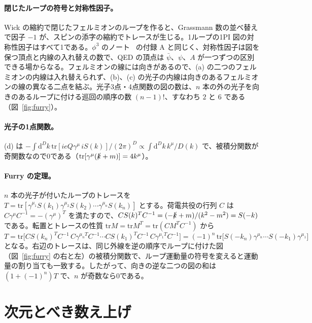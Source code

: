 \documentclass[a4paper,10pt]{ltjsarticle}
\newcommand{\dd}{\mathrm{d}}
\begin{document}
\paragraph{閉じたループの符号と対称性因子。}Wick の縮約で閉じたフェルミオンのループを作ると、Grassmann 数の並べ替えで因子 $-1$ が、スピンの添字の縮約でトレースが生じる。1ループの1PI 図の対称性因子はすべて1である。$\phi^3$ のノート~\cite{phi3note} の付録 A と同じく、対称性因子は図を保つ頂点と内線の入れ替えの数で、QED の頂点は $\bar\psi$、$\psi$、$A$ が一つずつの区別できる場からなる。フェルミオンの線には向きがあるので、(a) の二つのフェルミオンの内線は入れ替えられず、(b)、(c) の光子の内線は向きのあるフェルミオンの線の異なる二点を結ぶ。光子3点・4点関数の図の数は、$n$ 本の外の光子を向きのあるループに付ける巡回の順序の数 $(n-1)!$、すなわち $2$ と $6$ である（図~\ref{fig:furry}）。

\paragraph{光子の1点関数。}(d) は $-\int\dd^Dk\,\mathrm{tr}[ieQ\gamma^\mu\,iS(k)]/(2\pi)^D\propto\int\dd^Dk\,k^\mu/D(k)$ で、被積分関数が奇関数なので0である（$\mathrm{tr}[\gamma^\mu(\slashed k+m)]=4k^\mu$）。

\paragraph{Furry の定理。}$n$ 本の光子が付いたループのトレースを $T=\mathrm{tr}[\gamma^{\mu_1}S(k_1)\gamma^{\mu_2}S(k_2)\cdots\gamma^{\mu_n}S(k_n)]$ とする。荷電共役の行列 $C$ は $C\gamma^\mu C^{-1}=-(\gamma^\mu)^T$ を満たすので、$CS(k)^TC^{-1}=(-\slashed k+m)/(k^2-m^2)=S(-k)$ である。転置とトレースの性質 $\mathrm{tr}M=\mathrm{tr}M^T=\mathrm{tr}(CM^TC^{-1})$ から
\begin{equation*}
T=\mathrm{tr}\bigl[CS(k_n)^TC^{-1}\,C\gamma^{\mu_nT}C^{-1}\cdots CS(k_1)^TC^{-1}\,C\gamma^{\mu_1T}C^{-1}\bigr]
=(-1)^n\,\mathrm{tr}\bigl[S(-k_n)\gamma^{\mu_n}\cdots S(-k_1)\gamma^{\mu_1}\bigr]
\end{equation*}
となる。右辺のトレースは、同じ外線を逆の順序でループに付けた図（図~\ref{fig:furry} の右と左）の被積分関数で、ループ運動量の符号を変えると運動量の割り当ても一致する。したがって、向きの逆な二つの図の和は $(1+(-1)^n)T$ で、$n$ が奇数なら0である。

\section{次元とべき数え上げ}\label{app:counting}
\end{document}
